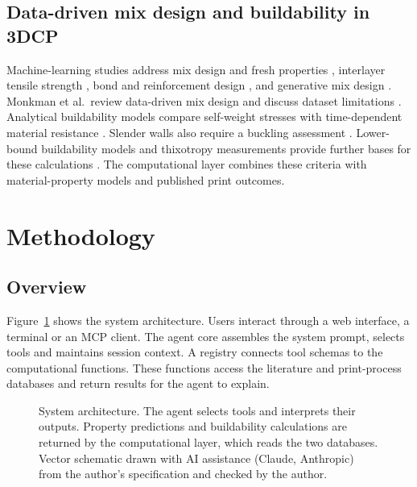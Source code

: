 \documentclass[preprint,12pt]{elsarticle}
\newcommand{\aidisclosure}{Vector schematic drawn with AI assistance (Claude, Anthropic) from the author's specification and checked by the author.}
\begin{document}
\subsection{Data-driven mix design and buildability in 3DCP}

Machine-learning studies address mix design and fresh properties \cite{malik2024mixdesign3dcp,zafar2025ensemblerheology}, interlayer tensile strength \cite{ali2023mltensile3dcp}, bond and reinforcement design \cite{ma2024trustworthyml3dcp}, and generative mix design \cite{wang2024deepgenerative3dcp}. Monkman et al.\ review data-driven mix design and discuss dataset limitations \cite{monkman2026datadrivenreview}. Analytical buildability models compare self-weight stresses with time-dependent material resistance \cite{roussel2018rheological,perrot2016structural,reiter2018role}. Slender walls also require a buckling assessment \cite{suiker2018mechanical,wolfs2018early}. Lower-bound buildability models and thixotropy measurements provide further bases for these calculations \cite{kruger2019lowerbound,kruger2019thixotropy}. The computational layer combines these criteria with material-property models and published print outcomes.

\section{Methodology}\label{sec:method}

\subsection{Overview}

Figure~\ref{fig:arch} shows the system architecture. Users interact through a web interface, a terminal or an MCP client. The agent core assembles the system prompt, selects tools and maintains session context. A registry connects tool schemas to the computational functions. These functions access the literature and print-process databases and return results for the agent to explain.

\begin{figure}[t]
\centering
\resizebox{\textwidth}{!}{}
\caption{System architecture. The agent selects tools and interprets their outputs. Property predictions and buildability calculations are returned by the computational layer, which reads the two databases. \aidisclosure}
\label{fig:arch}
\end{figure}
\end{document}
